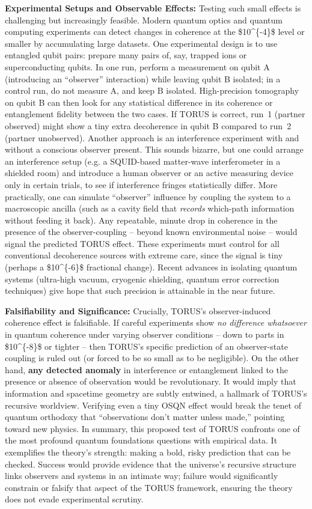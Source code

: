 \documentclass[]{article}
\begin{document}
\textbf{Experimental Setups and Observable Effects:} Testing such small
effects is challenging but increasingly feasible. Modern quantum optics
and quantum computing experiments can detect changes in coherence at the
\$10\^{}\{-4\}\$ level or smaller by accumulating large datasets. One
experimental design is to use entangled qubit pairs: prepare many pairs
of, say, trapped ions or superconducting qubits. In one run, perform a
measurement on qubit A (introducing an ``observer'' interaction) while
leaving qubit B isolated; in a control run, do not measure A, and keep B
isolated. High-precision tomography on qubit B can then look for any
statistical difference in its coherence or entanglement fidelity between
the two cases. If TORUS is correct, run~1 (partner observed) might show
a tiny extra decoherence in qubit B compared to run~2 (partner
unobserved​). Another approach is an interference experiment with and
without a conscious observer present. This sounds bizarre, but one could
arrange an interference setup (e.g. a SQUID-based matter-wave
interferometer in a shielded room) and introduce a human observer or an
active measuring device only in certain trials, to see if interference
fringes statistically differ​. More practically, one can simulate
``observer'' influence by coupling the system to a macroscopic ancilla
(such as a cavity field that \emph{records} which-path information
without feeding it back)​. Any repeatable, minute drop in coherence in
the presence of the observer-coupling -- beyond known environmental
noise -- would signal the predicted TORUS effect. These experiments must
control for all conventional decoherence sources with extreme care,
since the signal is tiny (perhaps a \$10\^{}\{-6\}\$ fractional
change​). Recent advances in isolating quantum systems (ultra-high
vacuum, cryogenic shielding, quantum error correction techniques) give
hope that such precision is attainable in the near future.

\textbf{Falsifiability and Significance:} Crucially, TORUS's
observer-induced coherence effect is falsifiable. If careful experiments
show \emph{no difference whatsoever} in quantum coherence under varying
observer conditions -- down to parts in \$10\^{}\{-8\}\$ or tighter --
then TORUS's specific prediction of an observer-state coupling is ruled
out (or forced to be so small as to be negligible)​. On the other hand,
\textbf{any detected anomaly} in interference or entanglement linked to
the presence or absence of observation would be revolutionary. It would
imply that information and spacetime geometry are subtly entwined, a
hallmark of TORUS's recursive worldview​. Verifying even a tiny OSQN
effect would break the tenet of quantum orthodoxy that ``observations
don't matter unless made,'' pointing toward new physics. In summary,
this proposed test of TORUS confronts one of the most profound quantum
foundations questions with empirical data. It exemplifies the theory's
strength: making a bold, risky prediction that can be checked. Success
would provide evidence that the universe's recursive structure links
observers and systems in an intimate way; failure would significantly
constrain or falsify that aspect of the TORUS framework, ensuring the
theory does not evade experimental scrutiny.
\end{document}
